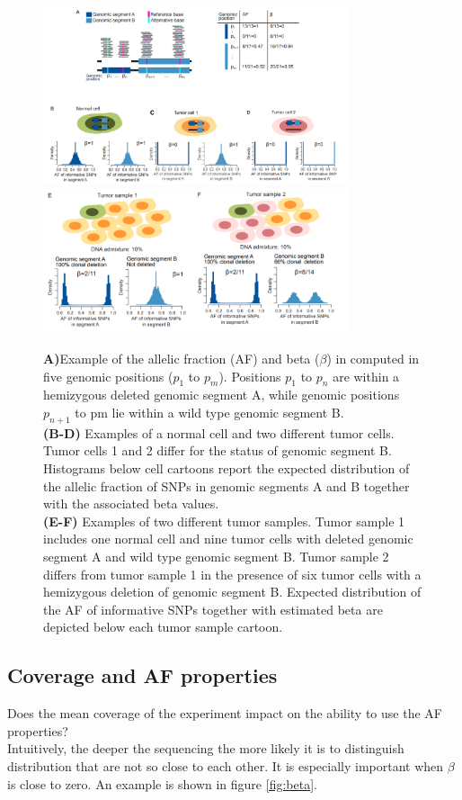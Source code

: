 \begin{figure}[htbp!]
	\centering
	\includegraphics[width=0.8\textwidth]{a.png}
	\includegraphics[width=0.8\textwidth]{b.png}
	\caption{ 
	\textbf{A)}Example of the allelic fraction (AF) and beta ($\beta$) in computed in five genomic positions ($p_1$ to $p_m$). Positions $p_1$ to $p_n$ are within a hemizygous deleted genomic segment A, while genomic positions $p_{n+1}$ to pm lie within a wild type genomic segment B.\\
\textbf{(B-D)} Examples of a normal cell and two different tumor cells. Tumor cells 1 and 2 differ for the status of genomic segment B. Histograms below cell cartoons report the expected distribution of the allelic fraction of SNPs in genomic segments A and B together with the associated beta values.\\
\textbf{(E-F)} Examples of two different tumor samples. Tumor sample 1 includes one normal cell and nine tumor cells with deleted genomic segment A and wild type genomic segment B. Tumor sample 2 differs from tumor sample 1 in the presence of six tumor cells with a hemizygous deletion of genomic segment B.
Expected distribution of the AF of informative SNPs together with estimated beta are depicted below each tumor sample cartoon.}
\label{fig:a_b}
\end{figure}

\subsection{Coverage and AF properties}
Does the mean coverage of the experiment impact on the ability to use the AF properties?\\
Intuitively, the deeper the sequencing the more likely it is to distinguish distribution that are not so close to each other. It is especially important when $\beta$ is close to zero. An example is shown in figure \ref{fig:beta}.


